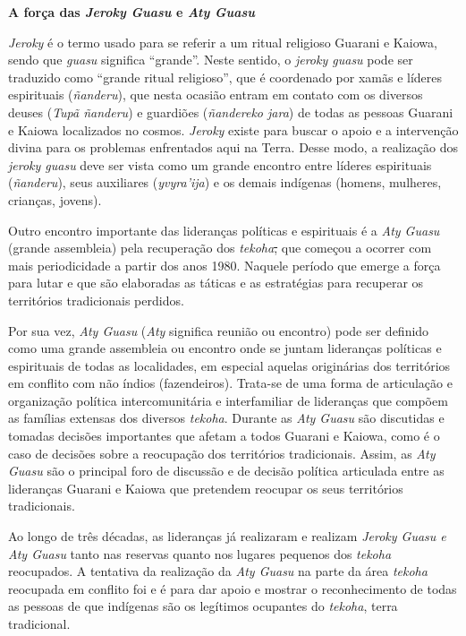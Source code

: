 \textbf{A força das \emph{Jeroky Guasu} e \emph{Aty Guasu}}

\emph{Jeroky} é o termo usado para se referir a um ritual religioso
Guarani e Kaiowa, sendo que \emph{guasu} significa ``grande''. Neste
sentido, o \emph{jeroky guasu} pode ser traduzido como ``grande ritual
religioso'', que é coordenado por xamãs e líderes espirituais
(\emph{ñanderu}), que nesta ocasião entram em contato com os diversos
deuses (\emph{Tupã ñanderu}) e guardiões (\emph{ñandereko jara}) de
todas as pessoas Guarani e Kaiowa localizados no cosmos. \emph{Jeroky}
existe para buscar o apoio e a intervenção divina para os problemas
enfrentados aqui na Terra. Desse modo, a realização dos \emph{jeroky
guasu} deve ser vista como um grande encontro entre líderes espirituais
(\emph{ñanderu}), seus auxiliares (\emph{yvyra'ija}) e os demais
indígenas (homens, mulheres, crianças, jovens).

Outro encontro importante das lideranças políticas e espirituais é a
\emph{Aty Guasu} (grande assembleia) pela recuperação dos
\emph{tekoha}\sout{,} que começou a ocorrer com mais periodicidade a
partir dos anos 1980. Naquele período que emerge a força para lutar e
que são elaboradas as táticas e as estratégias para recuperar os
territórios tradicionais perdidos.

Por sua vez, \emph{Aty Guasu} (\emph{Aty} significa reunião ou encontro)
pode ser definido como uma grande assembleia ou encontro onde se juntam
lideranças políticas e espirituais de todas as localidades, em especial
aquelas originárias dos territórios em conflito com não índios
(fazendeiros). Trata-se de uma forma de articulação e organização
política intercomunitária e interfamiliar de lideranças que compõem as
famílias extensas dos diversos \emph{tekoha}. Durante as \emph{Aty
Guasu} são discutidas e tomadas decisões importantes que afetam a todos
Guarani e Kaiowa, como é o caso de decisões sobre a reocupação dos
territórios tradicionais. Assim, as \emph{Aty Guasu} são o principal
foro de discussão e de decisão política articulada entre as lideranças
Guarani e Kaiowa que pretendem reocupar os seus territórios
tradicionais.

Ao longo de três décadas, as lideranças já realizaram e realizam
\emph{Jeroky Guasu e Aty Guasu} tanto nas reservas quanto nos lugares
pequenos dos \emph{tekoha} reocupados. A tentativa da realização da
\emph{Aty Guasu} na parte da área \emph{tekoha} reocupada em conflito
foi e é para dar apoio e mostrar o reconhecimento de todas as pessoas de
que indígenas são os legítimos ocupantes do \emph{tekoha}, terra
tradicional.

